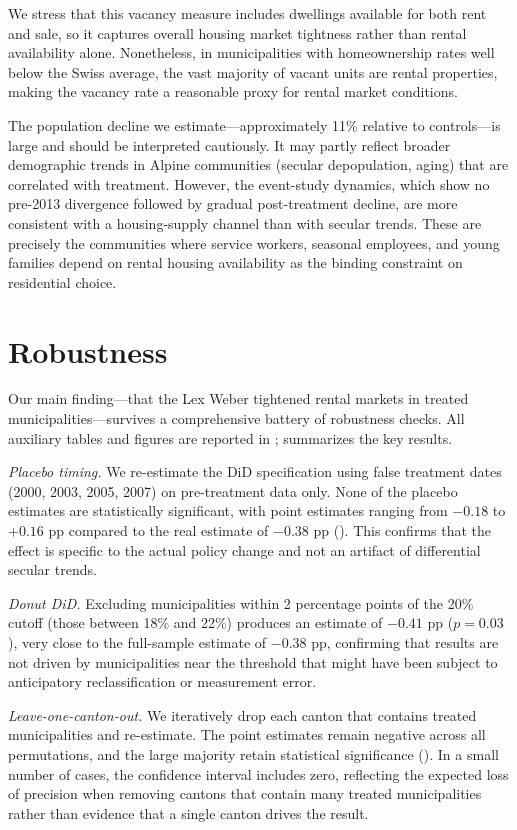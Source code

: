 \documentclass[12pt]{article}
\begin{document}
We stress that this vacancy measure includes dwellings available for both rent and sale, so it captures overall housing market tightness rather than rental availability alone. Nonetheless, in municipalities with homeownership rates well below the Swiss average, the vast majority of vacant units are rental properties, making the vacancy rate a reasonable proxy for rental market conditions.

The population decline we estimate---approximately 11\% relative to controls---is large and should be interpreted cautiously. It may partly reflect broader demographic trends in Alpine communities (secular depopulation, aging) that are correlated with treatment. However, the event-study dynamics, which show no pre-2013 divergence followed by gradual post-treatment decline, are more consistent with a housing-supply channel than with secular trends. These are precisely the communities where service workers, seasonal employees, and young families depend on rental housing availability as the binding constraint on residential choice.


\section{Robustness}
\label{sec:robustness}

Our main finding---that the Lex Weber tightened rental markets in treated municipalities---survives a comprehensive battery of robustness checks. All auxiliary tables and figures are reported in ;  summarizes the key results.

\textit{Placebo timing.} We re-estimate the DiD specification using false treatment dates (2000, 2003, 2005, 2007) on pre-treatment data only. None of the placebo estimates are statistically significant, with point estimates ranging from $-0.18$ to $+0.16$ pp compared to the real estimate of $-0.38$ pp (). This confirms that the effect is specific to the actual policy change and not an artifact of differential secular trends.

\textit{Donut DiD.} Excluding municipalities within 2 percentage points of the 20\% cutoff (those between 18\% and 22\%) produces an estimate of $-0.41$ pp ($p = 0.03$), very close to the full-sample estimate of $-0.38$ pp, confirming that results are not driven by municipalities near the threshold that might have been subject to anticipatory reclassification or measurement error.

\textit{Leave-one-canton-out.} We iteratively drop each canton that contains treated municipalities and re-estimate. The point estimates remain negative across all permutations, and the large majority retain statistical significance (). In a small number of cases, the confidence interval includes zero, reflecting the expected loss of precision when removing cantons that contain many treated municipalities rather than evidence that a single canton drives the result.
\end{document}
